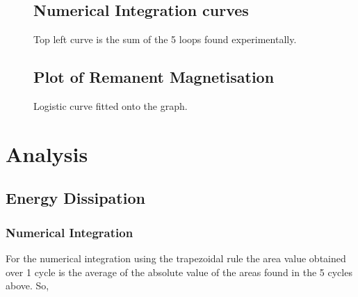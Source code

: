 \documentclass{article}
\begin{document}
\begin{figure}[p] \label{fig:loops}
    \subsection{Numerical Integration curves}
        \centering
        \scalebox{0.52}{}
        \hspace{0.5cm}
        \scalebox{0.52}{}
      
        \vspace{0.5cm}
      
        \scalebox{0.52}{}
        \hspace{0.5cm}
        \scalebox{0.52}{}
      
        \vspace{0.5cm}
      
        \scalebox{0.52}{}
        \hspace{0.5cm}
        \scalebox{0.52}{}
      
        \caption{Top left curve is the sum of the 5 loops found experimentally.}
    \end{figure}

\FloatBarrier

\begin{figure} [H]
    \subsection{Plot of Remanent Magnetisation}
    \centering
    \scalebox{0.75}{}
    \label{fig:curveexp}
    \caption{Logistic curve fitted onto the graph.}
\end{figure}

\section{Analysis}
\subsection{Energy Dissipation}
\subsubsection{Numerical Integration}
For the numerical integration using the trapezoidal rule the area value obtained over 1 cycle is 
the average of the absolute value of the areas found in the 5 cycles above. So,
\end{document}
